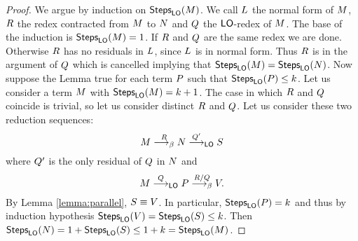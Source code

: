 \begin{LONG}
	\begin{proof}
		We argue by induction on $\textsf{Steps}_{\textsf{LO}}(M)$. We call $L$ the normal form of $M$, $R$ the redex contracted from $M$ to $N$ and $Q$ the $\textsf{LO}$-redex of $M$. The base of the induction is $\textsf{Steps}_{\textsf{LO}}(M)=1$. If $R$ and $Q$ are the same redex we are done. Otherwise $R$ has no residuals in $L$, since $L$ is in normal form. Thus $R$ is in the argument of $Q$ which is cancelled implying that $\textsf{Steps}_{\textsf{LO}}(M)=\textsf{Steps}_{\textsf{LO}}(N)$. Now suppose the Lemma true for each term $P$ such that $\textsf{Steps}_{\textsf{LO}}(P)\leq k$. Let us consider a term $M$ with $\textsf{Steps}_{\textsf{LO}}(M)=k+1$. The case in which $R$ and $Q$ coincide is trivial, so let us consider distinct $R$ and $Q$. Let us consider these two reduction sequences:
		$$
		M\overset{R}{\longrightarrow_\beta}N\overset{Q'}{\longrightarrow}_{\textsf{LO}}S
		$$
		where $Q'$ is the only residual of $Q$ in $N$ and
		$$
		M\overset{Q}{\longrightarrow}_{\textsf{LO}}P\overset{R/Q}{\longrightarrow_\beta}V.
		$$
		By Lemma \ref{lemma:parallel}, $S\equiv V$. In particular, $\textsf{Steps}_{\textsf{LO}}(P)=k$ and thus by induction hypothesis $\textsf{Steps}_{\textsf{LO}}(V)=\textsf{Steps}_{\textsf{LO}}(S)\leq k$. Then $\textsf{Steps}_{\textsf{LO}}(N)=1+\textsf{Steps}_{\textsf{LO}}(S)\leq 1+k=\textsf{Steps}_{\textsf{LO}}(M)$.
	\end{proof}

\end{LONG}
